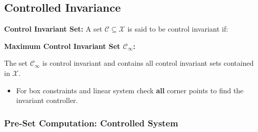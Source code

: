 \documentclass[8pt,a4paper]{scrartcl}
\begin{document}
\begin{multicols*}{3}
\begin{multicols*}{4}
\subsection{Controlled Invariance}

\textbf{Control Invariant Set:} A set $\mathcal{C}\subseteq\mathcal{X}$ is said to be control invariant if:


\textbf{Maximum Control Invariant Set $\mathcal{C}_\infty$:}

The set $\mathcal{C}_\infty$ is control invariant and contains all control invariant sets contained in $\mathcal{X}$.


\begin{itemize}
\item For box constraints and linear system check \textbf{all} corner points to find the invariant controller.
\end{itemize}

\subsubsection{Pre-Set Computation: Controlled System}

\tiny
{}
\normalsize



\end{multicols*}
\end{multicols*}
\end{document}
